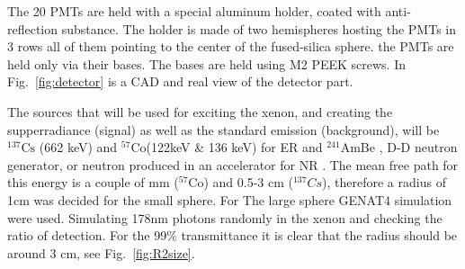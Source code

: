 The 20 PMTs are held with a special aluminum holder, coated with anti-reflection substance. The holder is made of two hemispheres hosting the PMTs in 3 rows all of them pointing to the center of the fused-silica sphere. the PMTs are held only via their bases. The bases are held using M2 PEEK screws. In Fig.~\ref{fig:detector} is a CAD and real view of the detector part.


The sources that will be used for exciting the xenon, and creating the supperradiance (signal) as well as the standard emission (background), will be $^{137} \mathrm{Cs}$ (662 keV) and $^{57} \mathrm{Co}$(122keV \& 136 keV) for ER and $^241$AmBe , D-D neutron generator, or neutron produced in an accelerator for NR . The mean free path for this energy is a couple of mm ($^{57} \mathrm{Co}$) and 0.5-3 cm ($^{137} Cs$), therefore a radius of 1cm was decided for the small sphere. For The large sphere GENAT4 simulation were used. Simulating 178nm photons randomly in the xenon and checking the ratio of detection. For the 99\% transmittance it is clear that the radius should be around 3 cm, see Fig.~\ref{fig:R2size}. 

